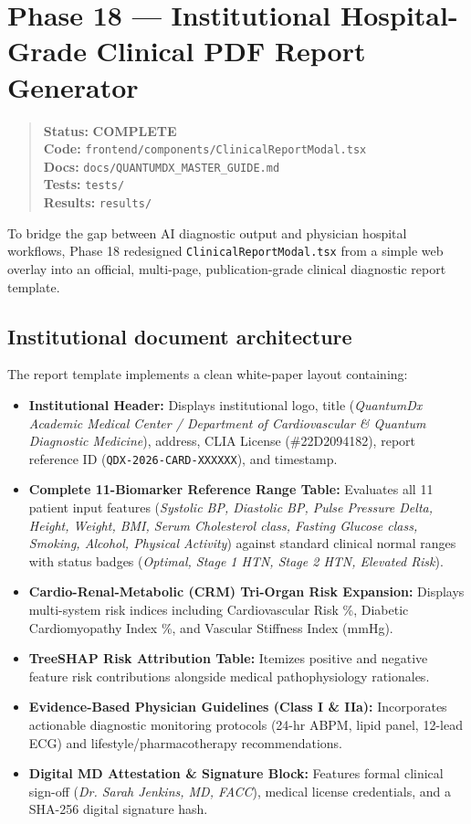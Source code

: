 \documentclass[11pt,a4paper]{article}
\newcommand{\code}[1]{\texttt{\small #1}}
\newcommand{\done}{\textcolor{donecolor}{\textbf{COMPLETE}}}
\newcommand{\phasestatus}[5]{%
\begin{quote}\small\raggedright
\textbf{Status:} #1 \\
\textbf{Code:} #2 \\
\textbf{Docs:} #3 \\
\textbf{Tests:} #4 \\
\textbf{Results:} #5
\end{quote}}
\begin{document}
\section{Phase 18 --- Institutional Hospital-Grade Clinical PDF Report Generator}
\label{sec:phase18}

\phasestatus{\done}{\code{frontend/components/ClinicalReportModal.tsx}}{\code{docs/QUANTUMDX\_MASTER\_GUIDE.md}}{\code{tests/}}{\code{results/}}

To bridge the gap between AI diagnostic output and physician hospital workflows, Phase 18 redesigned \code{ClinicalReportModal.tsx} from a simple web overlay into an official, multi-page, publication-grade clinical diagnostic report template.

\subsection{Institutional document architecture}
The report template implements a clean white-paper layout containing:
\begin{itemize}[leftmargin=1.4em]
  \item \textbf{Institutional Header:} Displays institutional logo, title (\emph{QuantumDx Academic Medical Center / Department of Cardiovascular \& Quantum Diagnostic Medicine}), address, CLIA License (\#22D2094182), report reference ID (\code{QDX-2026-CARD-XXXXXX}), and timestamp.
  \item \textbf{Complete 11-Biomarker Reference Range Table:} Evaluates all 11 patient input features (\emph{Systolic BP, Diastolic BP, Pulse Pressure Delta, Height, Weight, BMI, Serum Cholesterol class, Fasting Glucose class, Smoking, Alcohol, Physical Activity}) against standard clinical normal ranges with status badges (\emph{Optimal, Stage 1 HTN, Stage 2 HTN, Elevated Risk}).
  \item \textbf{Cardio-Renal-Metabolic (CRM) Tri-Organ Risk Expansion:} Displays multi-system risk indices including Cardiovascular Risk \%, Diabetic Cardiomyopathy Index \%, and Vascular Stiffness Index (mmHg).
  \item \textbf{TreeSHAP Risk Attribution Table:} Itemizes positive and negative feature risk contributions alongside medical pathophysiology rationales.
  \item \textbf{Evidence-Based Physician Guidelines (Class I \& IIa):} Incorporates actionable diagnostic monitoring protocols (24-hr ABPM, lipid panel, 12-lead ECG) and lifestyle/pharmacotherapy recommendations.
  \item \textbf{Digital MD Attestation \& Signature Block:} Features formal clinical sign-off (\emph{Dr. Sarah Jenkins, MD, FACC}), medical license credentials, and a SHA-256 digital signature hash.
\end{itemize}
\end{document}
